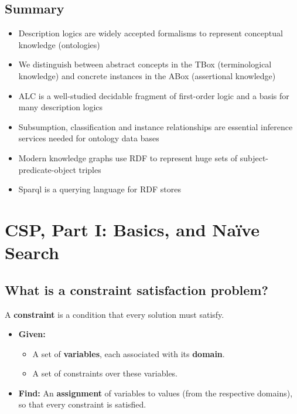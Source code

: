 \documentclass[conference]{styles/acmsiggraph}
\begin{document}
    \subsection{Summary}
        \begin{itemize}
            \item Description logics are widely accepted formalisms to represent conceptual knowledge (ontologies)
            \item We distinguish between abstract concepts in the TBox (terminological knowledge) and concrete instances in the ABox (assertional knowledge)
            \item ALC is a well-studied decidable fragment of first-order logic and a basis for many description logics
            \item Subsumption, classification and instance relationships are essential inference services needed for ontology data bases
            \item Modern knowledge graphs use RDF to represent huge sets of subject-predicate-object triples
            \item Sparql is a querying language for RDF stores
        \end{itemize}

\newpage

\section{CSP, Part I: Basics, and Na{\"i}ve Search}

    \subsection{What is a constraint satisfaction problem?}
        A \textbf{constraint} is a condition that every solution must satisfy.
        \begin{itemize}
            \item \textbf{Given:}
                \begin{itemize}
                    \item A set of \textbf{variables}, each associated with its \textbf{domain}.
                    \item A set of constraints over these variables.
                \end{itemize}
            \item \textbf{Find:} An \textbf{assignment} of variables to values (from the respective domains), so that every constraint is satisfied.
        \end{itemize}
    
\end{document}
